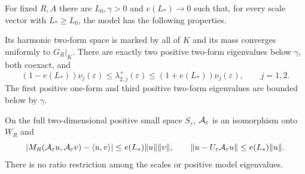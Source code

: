 \begin{theorem}\label{thm:complete-model}
For fixed $R,A$ there are $L_0,\gamma>0$ and $e(L_*)\to0$ such
that, for every scale vector with $L_*\ge L_0$, the model has the
following properties.

Its harmonic two-form space is marked by all of $K$ and its mass
converges uniformly to $G_R|_K$. There are exactly two positive
two-form eigenvalues below $\gamma$, both coexact, and
\begin{equation}\label{eq:complete-model-rates}
 (1-e(L_*))\nu_j(\varepsilon)
       \le\lambda^+_{2,j}(\varepsilon)
       \le(1+e(L_*))\nu_j(\varepsilon),\qquad j=1,2.
\end{equation}
The first positive one-form and third positive two-form eigenvalues
are bounded below by $\gamma$.

On the full two-dimensional positive small space $S_\varepsilon$,
$\mathcal A_\varepsilon$ is an isomorphism onto $W_R$ and
\begin{equation}\label{eq:model-cluster-mass}
 \left|M_R(\mathcal A_\varepsilon u,\mathcal A_\varepsilon v)
                           -\langle u,v\rangle\right|
       \le e(L_*)\|u\|\|v\|,\qquad
 \|u-U_\varepsilon\mathcal A_\varepsilon u\|
       \le e(L_*)\|u\|.
\end{equation}
There is no ratio restriction among the scales or positive model
eigenvalues.
\end{theorem}

